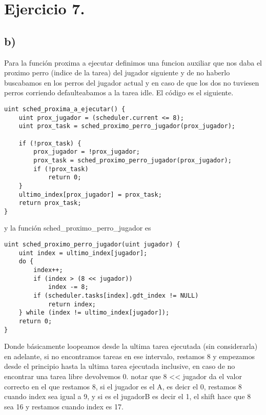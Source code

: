 \section{Ejercicio 7.}

\subsection{b)}

Para la función proxima a ejecutar definimos una funcion auxiliar que nos daba el proximo perro (indice de la tarea) del jugador siguiente y de no haberlo buscabamos en los perros del jugador actual y en caso de que los dos no tuviesen perros corriendo defaulteabamos a la tarea idle. El código es el siguiente.

\begin{codesnippet}
\begin{verbatim}
uint sched_proxima_a_ejecutar() {
    uint prox_jugador = (scheduler.current <= 8);
    uint prox_task = sched_proximo_perro_jugador(prox_jugador);

    if (!prox_task) {
        prox_jugador = !prox_jugador;
        prox_task = sched_proximo_perro_jugador(prox_jugador);
        if (!prox_task)
            return 0;
    }
    ultimo_index[prox_jugador] = prox_task;
    return prox_task;
}
\end{verbatim}
\end{codesnippet}

y la función sched_proximo_perro_jugador es 

\begin{codesnippet}
\begin{verbatim}
uint sched_proximo_perro_jugador(uint jugador) {
    uint index = ultimo_index[jugador];
    do {
        index++;
        if (index > (8 << jugador))
            index -= 8;
        if (scheduler.tasks[index].gdt_index != NULL)
            return index;
    } while (index != ultimo_index[jugador]);
    return 0;
}
\end{verbatim}
\end{codesnippet}

Donde básicamente loopeamos desde la ultima tarea ejecutada (sin considerarla) en adelante, si no encontramos tareas en ese intervalo, restamos 8 y empezamos desde el principio hasta la ultima tarea ejecutada inclusive, en caso de no encontrar una tarea 
libre devolvemos 0. notar que 8 << jugador da el valor correcto en el que restamos 8, si el jugador es el A, es deicr el 0, restamos 8 cuando index sea igual a 9, y si es el jugadorB es decir el 1, el shift hace que 8 sea 16 y restamos cuando index es 17. 

